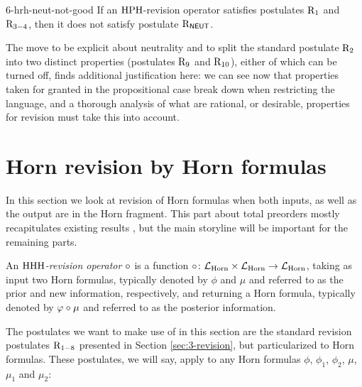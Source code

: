 \begin{crl}{}{6-hrh-neut-not-good}
	If an ${\mathrm{HPH}}$-revision operator satisfies postulates 
	$\mathrm{R}_{1}$ and $\mathrm{R}_{3-4}$, 
	then it does not satisfy postulate $\mathrm{R}_{\mathsf{NEUT}}$.
\end{crl}

The move to be explicit about neutrality and to split
the standard postulate $\mathrm{R}_{2}$ into two distinct properties
(postulates $\mathrm{R}_{9}$ and $\mathrm{R}_{10}$), either of which can be turned off,
finds additional justification here:
we can see now that properties taken for granted in the propositional case
break down when restricting the language,
and a thorough analysis of what are rational, 
or desirable, properties for revision
must take this into account.


















\section{Horn revision by Horn formulas}\label{sec:6-hhh-revision}
In this section we look at revision of Horn formulas 
when both inputs, as well as the output are in the Horn fragment.
This part about total preorders mostly recapitulates existing results \cite{DelgrandeP15,DelgrandePW18},
but the main storyline will be important for the remaining parts.
 
An \emph{${\mathrm{HHH}}$-revision operator $\circ$} is a function 
$\circ\colon\mathcal{L}_{\mathrm{Horn}}\times\mathcal{L}_{\mathrm{Horn}}\rightarrow\mathcal{L}_{\mathrm{Horn}}$,
taking as input two Horn formulas, 
typically denoted by $\phi$ and $\mu$
and referred to as the prior and new information, respectively,
and returning a Horn formula,
typically denoted by $\varphi\circ\mu$
and referred to as the posterior information.

The postulates we want to make use of in this section 
are the standard revision postulates $\mathrm{R}_{1-8}$ 
presented in Section \ref{sec:3-revision},
but particularized to Horn formulas.
These postulates, we will say, 
apply to any Horn formulas
$\phi$, $\phi_{1}$, $\phi_{2}$,
$\mu$, $\mu_{1}$ and $\mu_{2}$:

